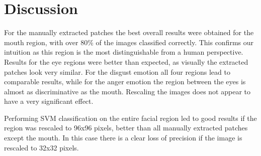 \section{Discussion}
For the manually extracted patches the best overall results were obtained for the mouth region, with over 80\% of the images classified correctly.
This confirms our intuition as this region is the most distinguishable
from a human perspective. Results for the eye regions were better than expected, as visually the extracted patches look very similar. For the disgust emotion all 
four regions lead to comparable results, while for the anger emotion the region between the eyes is almost as discriminative as the mouth. 
Rescaling the images does not appear to have a very significant effect. 

Performing SVM classification on the entire facial region led to good results if the region was rescaled to 96x96 pixels, better than all manually extracted 
patches except the mouth. In this case there is a clear loss
of precision if the image is rescaled to 32x32 pixels. %



